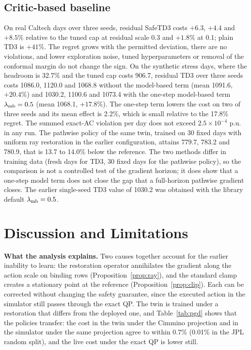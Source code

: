 \documentclass[11pt]{article}
\begin{document}
\subsection{Critic-based baseline}\label{sec:rl}
On real Caltech days over three seeds, residual SafeTD3 costs $+6.3$, $+4.4$ and $+8.5\%$ relative to the tuned cap at residual scale 0.3 and $+1.8\%$ at 0.1; plain TD3 is $+41\%$. The regret grows with the permitted deviation, there are no violations, and lower exploration noise, tuned hyperparameters or removal of the conformal margin do not change the sign. On the synthetic stress days, where the headroom is 32.7\% and the tuned cap costs 906.7, residual TD3 over three seeds costs 1086.0, 1120.0 and 1068.8 without the model-based term (mean 1091.6, $+20.4\%$) and 1030.2, 1100.6 and 1073.4 with the one-step model-based term $\lambda_{\rm mb}=0.5$ (mean 1068.1, $+17.8\%$). The one-step term lowers the cost on two of three seeds and its mean effect is 2.2\%, which is small relative to the 17.8\% regret. The summed exact-AC violation per day does not exceed $2.5\times10^{-4}$ p.u. in any run. The pathwise policy of the same twin, trained on 30 fixed days with uniform ray restoration in the earlier configuration, attains 779.7, 783.2 and 780.9, that is 13.7 to 14.0\% below the reference. The two methods differ in training data (fresh days for TD3, 30 fixed days for the pathwise policy), so the comparison is not a controlled test of the gradient horizon; it does show that a one-step model term does not close the gap that a full-horizon pathwise gradient closes. The earlier single-seed TD3 value of 1030.2 was obtained with the library default $\lambda_{\rm mb}=0.5$.

\section{Discussion and Limitations}\label{sec:disc}
\textbf{What the analysis explains.} Two causes together account for the earlier inability to learn: the restoration operator annihilates the gradient along the action scale on binding rows (Proposition~\ref{prop:ray}), and the standard clamp creates a stationary point at the reference (Proposition~\ref{prop:clip}). Each can be corrected without changing the safety guarantee, since the executed action in the simulator still passes through the exact QP. The twin is trained under a restoration that differs from the deployed one, and Table~\ref{tab:pgd} shows that the policies transfer: the cost in the twin under the Cimmino projection and in the simulator under the same projection agree to within 0.7\% (0.01\% in the JPL random split), and the live cost under the exact QP is lower still.
\end{document}
